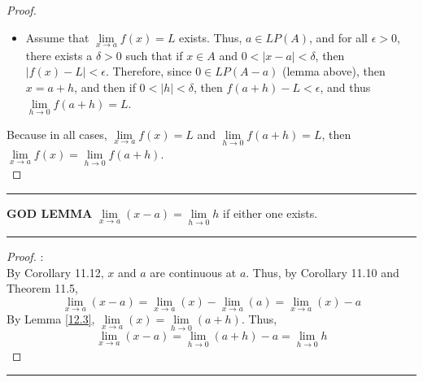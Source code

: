 \documentclass[openany, amssymb, psamsfonts]{amsart}
\theoremstyle{definition}
\numberwithin{equation}{section}
\begin{document}
\begin{proof}
\begin{itemize}
     \item Assume that $\lim\limits_{x\to a}f(x) = L$ exists. Thus, $a\in LP(A)$, and for all $\epsilon>0$, there exists a $\delta>0$ such that if $x\in A$ and $0<|x-a|<\delta$, then $|f(x) - L|< \epsilon$. Therefore, since $0\in LP (A - a)$ (lemma above), then $x = a+h$, and then if $0<|h| < \delta$, then $f(a+h) - L < \epsilon$, and thus $\lim\limits_{h\to 0}f(a+h) = L$.
 \end{itemize}
Because in all cases, $\lim\limits_{x\to a}f(x) = L$ and $\lim\limits_{h\to 0}f(a+h) = L$, then $\lim\limits_{x\to a}f(x) = \lim\limits_{h\to 0}f(a+h)$.\\
\end{proof} \vspace{4pt}     \hrule   \vspace{4pt}

\textbf{GOD LEMMA} \label{GOD LEMMA}$\lim\limits_{x\to a}(x-a) = \lim\limits_{h\to 0}h$ if either one exists.
 \vspace{4pt}     \hrule   \vspace{4pt} \begin{proof}:\\
By Corollary 11.12, $x$ and $a$ are continuous at $a$. Thus, by Corollary 11.10 and Theorem 11.5, \[\lim\limits_{x\to a}(x-a) = \lim\limits_{x\to a}(x) - \lim\limits_{x\to a}(a) = \lim\limits_{x\to a}(x) - a\] 
By Lemma \ref{12.3}, $\lim\limits_{x\to a}(x) = \lim\limits_{h\to 0 } (a+h)$. Thus, \[\lim\limits_{x\to a}(x-a) = \lim\limits_{h\to 0 } (a+h) - a = \lim\limits_{h\to 0 } h\]
\end{proof} \vspace{4pt}     \hrule   \vspace{4pt}
\end{document}

